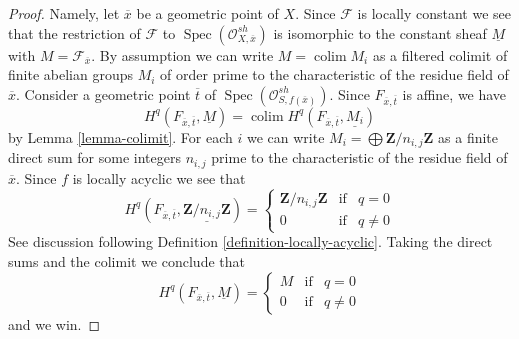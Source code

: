 \documentclass[10pt,a4paper]{amsart}
\theoremstyle{plain}
\theoremstyle{definition}
\theoremstyle{remark}
\numberwithin{equation}{subsection}
\def\colim{\mathop{\mathrm{colim}}\nolimits}
\def\Spec{\mathop{\mathrm{Spec}}}
\begin{document}
\begin{proof}
Namely, let $\overline{x}$ be a geometric point of $X$.
Since $\mathcal{F}$ is locally constant we see that
the restriction of $\mathcal{F}$ to $\Spec(\mathcal{O}^{sh}_{X, \overline{x}})$
is isomorphic to the constant sheaf $\underline{M}$ with
$M = \mathcal{F}_{\overline{x}}$. By assumption we can write
$M = \colim M_i$ as a filtered colimit of finite abelian groups
$M_i$ of order prime to the characteristic of the residue field of
$\overline{x}$. Consider a geometric point $\overline{t}$ of
$\Spec(\mathcal{O}^{sh}_{S, f(\overline{x})})$.
Since $F_{\overline{x}, \overline{t}}$ is affine, we have
$$
H^q(F_{\overline{x}, \overline{t}}, \underline{M}) =
\colim H^q(F_{\overline{x}, \overline{t}}, \underline{M_i})
$$
by Lemma \ref{lemma-colimit}.
For each $i$ we can write $M_i = \bigoplus \mathbf{Z}/n_{i, j}\mathbf{Z}$
as a finite direct sum for some integers $n_{i, j}$ prime to the
characteristic of the residue field of $\overline{x}$.
Since $f$ is locally acyclic we see that
$$
H^q(F_{\overline{x}, \overline{t}},
\underline{\mathbf{Z}/n_{i, j}\mathbf{Z}}) =
\left\{
\begin{matrix}
\mathbf{Z}/n_{i, j}\mathbf{Z} & \text{if} & q = 0 \\
0 & \text{if} & q \not = 0
\end{matrix}
\right.
$$
See discussion following Definition \ref{definition-locally-acyclic}.
Taking the direct sums and the colimit we conclude that
$$
H^q(F_{\overline{x}, \overline{t}}, \underline{M}) =
\left\{
\begin{matrix}
M & \text{if} & q = 0 \\
0 & \text{if} & q \not = 0
\end{matrix}
\right.
$$
and we win.
\end{proof}
\end{document}
